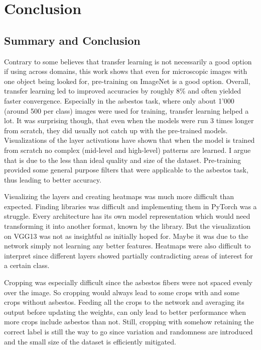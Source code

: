 \chapter{Conclusion}

\section{Summary and Conclusion}

Contrary to some believes that transfer learning is not necessarily a good option if using across domains, this work shows that even for microscopic images with one object being looked for, pre-training on ImageNet is a good option. Overall, transfer learning led to improved accuracies by roughly 8\% and often yielded faster convergence. Especially in the asbestos task, where only about 1'000 (around 500 per class) images were used for training, transfer learning helped a lot. It was surprising though, that even when the models were run 3 times longer from scratch, they did usually not catch up with the pre-trained models. Visualizations of the layer activations have shown that when the model is trained from scratch no complex (mid-level and high-level) patterns are learned. I argue that is due to the less than ideal quality and size of the dataset. Pre-training provided some general purpose filters that were applicable to the asbestos task, thus leading to better accuracy.

Visualizing the layers and creating heatmaps was much more difficult than expected. Finding libraries was difficult and implementing them in PyTorch was a struggle. Every architecture has its own model representation which would need transforming it into another format, known by the library. But the visualization on VGG13 was not as insightful as initially hoped for. Maybe it was due to the network simply not learning any better features. Heatmaps were also difficult to interpret since different layers showed partially contradicting areas of interest for a certain class.

Cropping was especially difficult since the asbestos fibers were not spaced evenly over the image. So cropping would always lead to some crops with and some crops without asbestos. Feeding all the crops to the network and averaging its output before updating the weights, can only lead to better performance when more crops include asbestos than not. Still, cropping with somehow retaining the correct label is still the way to go since variation and randomness are introduced and the small size of the dataset is efficiently mitigated.

